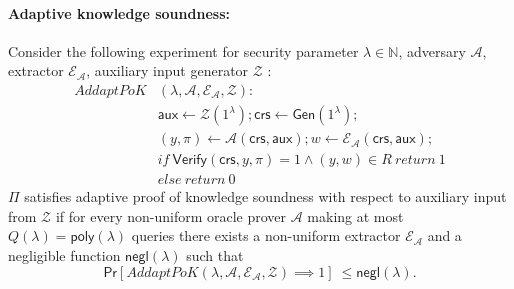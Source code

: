 \begin{definition}
\paragraph{Adaptive knowledge soundness:} Consider the following experiment for security 
parameter $\lambda \in \mathbb{N}$, adversary $\mathcal{A}$, extractor $\mathcal{E}_{\mathcal{A}}$, auxiliary 
input generator $\mathcal{Z}$ :\\
\begin{align*}
\mathit{AddaptPoK}&(\lambda, \mathcal{A}, \mathcal{E}_{\mathcal{A}}, \mathcal{Z}): \\
& \mathsf{aux} \leftarrow \mathcal{Z}(1^{\lambda}); \mathsf{crs} \leftarrow \mathsf{Gen}(1^{\lambda}); \\
& (y,\pi) \leftarrow \mathcal{A}(\mathsf{crs},\mathsf{aux}); w \leftarrow \mathcal{E}_{\mathcal{A}}(\mathsf{crs}, \mathsf{aux}); \\
& if \ \mathsf{Verify}(\mathsf{crs}, y, \pi) = 1 \wedge (y,w) \in R \ return  \ 1 \\
& else \ return \ 0
\end{align*}
\noindent $\Pi$ satisfies adaptive proof of knowledge soundness with respect to auxiliary input from $\mathcal{Z}$ if 
for every non-uniform oracle prover $\mathcal{A}$ making at most 
$Q(\lambda) = \mathsf{poly}(\lambda)$ queries there exists a non-uniform extractor $\mathcal{E}_{\mathcal{A}}$ 
and a negligible function $\mathsf{negl}(\lambda)$ such that 
$$\mathsf{Pr}[\mathit{AddaptPoK}(\lambda, \mathcal{A}, \mathcal{E}_{\mathcal{A}}, \mathcal{Z}) \implies  1]\ \leq \mathsf{negl}(\lambda).$$


\end{definition}
